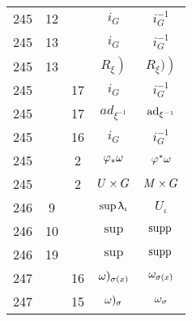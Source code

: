 \documentclass[a4paper,11pt]{article}
\begin{document}
\begin{center}
\begin{tabular}{|c|c|c|c|c|}
    245 & 12 & & $i_{ G }$ & $i_{ G }^{ -1 }$ \\
    245 & 13 & & $i_{ G }$ & $i_{ G }^{ -1 }$ \\
    245 & 13 & & $\left. R_{ \xi } \right)$ & $\left. R_{ \xi } ) \right)$ \\
    245 & & 17 & $i_{ G }$ & $i_{ G }^{ -1 }$ \\
    245 & & 17 & $ad_{ \xi^{ -1 } }$ & $\mathrm{ad}_{ \xi^{ -1 } }$ \\
    245 & & 16 & $i_{ G }$ & $i_{ G }^{ -1 }$ \\
    245 & &  2 & $\varphi_{ * } \omega$ & $\varphi^{ * } \omega$ \\
    245 & &  2 & $U \times G$ & $M \times G$ \\
    246 &  9 & & $\sup \uplambda_{ \iota }$ & $U_{ \iota }$ \\
    246 & 10 & & $\sup$ & $\mathrm{supp}\,$ \\
    246 & 19 & & $\sup$ & $\mathrm{supp}\,$ \\
    247 & & 16 & $\omega )_{ \sigma( x ) }$ & $\omega_{ \sigma( x ) }$ \\
    247 & & 15 & $\omega )_{ \sigma }$ & $\omega_{ \sigma }$ \\
    \hline
  \end{tabular}


\end{center}
\end{document}
